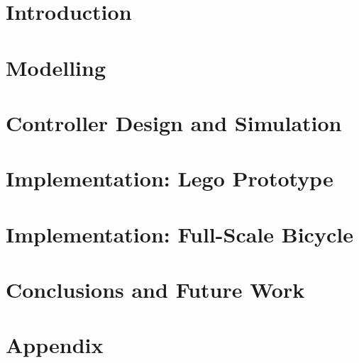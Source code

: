 





\section{Introduction}


\section{Modelling}


\section{Controller Design and Simulation}


\section{Implementation: Lego Prototype}


\section{Implementation: Full-Scale Bicycle}


\section{Conclusions and Future Work}




\section*{Appendix}


